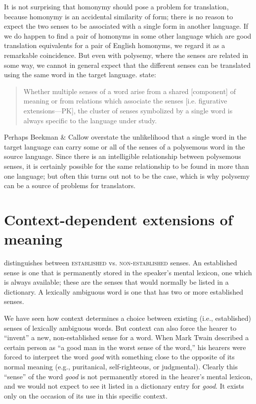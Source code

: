 It is not surprising that homonymy should pose a problem for translation, because homonymy is an accidental similarity of form; there is no reason to expect the two senses to be associated with a single form in another language. If we do happen to find a pair of homonyms in some other language which are good translation equivalents for a pair of English homonyms, we regard it as a remarkable coincidence. But even with polysemy, where the senses are related in some way, we cannot in general expect that the different senses can be translated using the same word in the target language.   \citet[103]{BeekmanCallow1974} state:


\begin{quote}
Whether multiple senses of a word arise from a shared [component] of meaning or from relations which associate the senses [i.e. figurative extensions—PK], the cluster of senses symbolized by a single word is always specific to the language under study.
\end{quote}


Perhaps Beekman \& Callow overstate the unlikelihood that a single word in the target language can carry some or all of the senses of a polysemous word in the source language. Since there is an intelligible relationship between polysemous senses, it is certainly possible for the same relationship to be found in more than one language; but often this turns out not to be the case, which is why polysemy can be a source of problems for translators.


\section{Context-dependent extensions of meaning}\label{sec:5.4}
\begin{sloppypar}
\citet{Cruse1986,Cruse2000} distinguishes between \textsc{established} vs. \textsc{non-established} senses. An established sense is one that is permanently stored in the speaker’s mental lexicon, one which is always available; these are the senses that would normally be listed in a dictionary. A lexically ambiguous word is one that has two or more established senses.
\end{sloppypar}


We have seen how context determines a choice between existing (i.e., established) senses of lexically ambiguous words. But context can also force the hearer to “invent” a new, non-established sense for a word. When Mark Twain described a certain person as “a good man in the worst sense of the word,” his hearers were forced to interpret the word \textit{good} with something close to the opposite of its normal meaning (e.g., puritanical, self-righteous, or judgmental). Clearly this “sense” of the word \textit{good} is not permanently stored in the hearer’s mental lexicon, and we would not expect to see it listed in a dictionary entry for \textit{good}. It exists only on the occasion of its use in this specific context.



